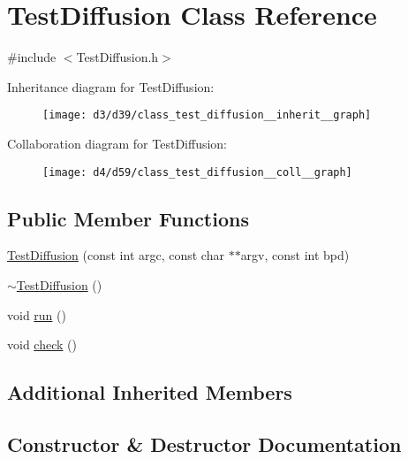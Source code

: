 \hypertarget{class_test_diffusion}{}\section{Test\+Diffusion Class Reference}
\label{class_test_diffusion}


{\ttfamily \#include $<$Test\+Diffusion.\+h$>$}



Inheritance diagram for Test\+Diffusion\+:\nopagebreak
\begin{figure}[H]
\begin{center}
\leavevmode
\texttt{[image: d3/d39/class\_test\_diffusion\_\_inherit\_\_graph]}
\end{center}
\end{figure}


Collaboration diagram for Test\+Diffusion\+:\nopagebreak
\begin{figure}[H]
\begin{center}
\leavevmode
\texttt{[image: d4/d59/class\_test\_diffusion\_\_coll\_\_graph]}
\end{center}
\end{figure}
\subsection*{Public Member Functions}
\begin{DoxyCompactItemize}
\item 
\hyperlink{class_test_diffusion_afa617e3798e6e5114b79aa2682dce800}{Test\+Diffusion} (const int argc, const char $\ast$$\ast$argv, const int bpd)
\item 
\hyperlink{class_test_diffusion_a81255efb8659f305a00671a977eef7c9}{$\sim$\+Test\+Diffusion} ()
\item 
void \hyperlink{class_test_diffusion_ae4f122102bda38ee01e0fc38cb77f57b}{run} ()
\item 
void \hyperlink{class_test_diffusion_aab6a401e99cbc30769c37e4a5921fd37}{check} ()
\end{DoxyCompactItemize}
\subsection*{Additional Inherited Members}


\subsection{Constructor \& Destructor Documentation}
\hypertarget{class_test_diffusion_afa617e3798e6e5114b79aa2682dce800}{}

